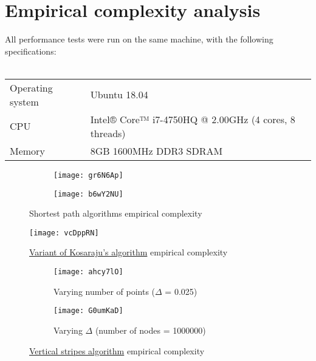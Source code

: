 \chapter{Empirical complexity analysis} \label{empirical}

All performance tests were run on the same machine, with the following specifications:\\ \\
\begin{tabular}{l l}
    Operating system & Ubuntu 18.04 \\
    CPU              & Intel® Core™ i7-4750HQ @ 2.00GHz (4 cores, 8 threads) \\
    Memory           & 8GB 1600MHz DDR3 SDRAM
\end{tabular}

\begin{figure}[H]
    \centering
    \begin{subfigure}{0.49\textwidth}
        \centering
        \texttt{[image: gr6N6Ap]}
    \end{subfigure}
    \begin{subfigure}{0.49\textwidth}
        \centering
        \texttt{[image: b6wY2NU]}
    \end{subfigure}
    \caption{Shortest path algorithms empirical complexity}
\end{figure}

\begin{figure}[H]
    \centering
    \texttt{[image: vcDppRN]}
    \caption{\hyperref[algorithm-scc-kosaraju-v]{Variant of Kosaraju's algorithm} empirical complexity}
\end{figure}

\begin{figure}[H]
    \centering
    \begin{subfigure}{0.49\textwidth}
        \centering
        \texttt{[image: ahcy7lO]}
        \caption{Varying number of points ($\Delta$ = 0.025)}
    \end{subfigure}
    \begin{subfigure}{0.49\textwidth}
        \centering
        \texttt{[image: G0umKaD]}
        \caption{Varying $\Delta$ (number of nodes = 1000000)}
    \end{subfigure}
    \caption{\hyperref[algorithm-vstripes]{Vertical stripes algorithm} empirical complexity}
\end{figure}


